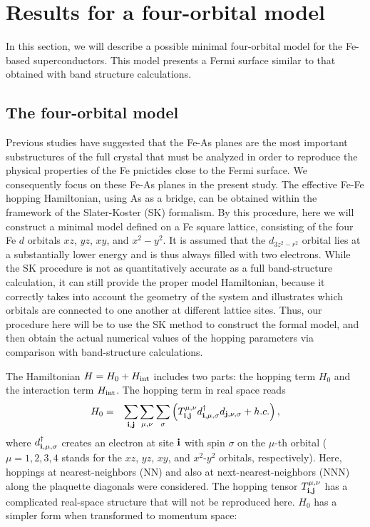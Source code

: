 \documentclass[aps,prb,superscriptaddress,preprintnumbers,
showpacs,legalpaper,twoside,twocolumn,amsmath,amssymb]{revtex4}
\begin{document}
\section{Results for a four-orbital model}

In this section, we will describe a possible minimal four-orbital model for
the Fe-based superconductors. This model presents a Fermi surface similar to that
obtained with band structure calculations.

\subsection{The four-orbital model}

Previous studies have suggested that the Fe-As planes are the most
important substructures of the full crystal that must be analyzed in order
to reproduce the physical properties of the Fe pnictides
close to the Fermi surface. We consequently focus on these
Fe-As planes in the present study.
The effective Fe-Fe hopping Hamiltonian, using As as a bridge,
can be obtained within the
framework of the Slater-Koster (SK) formalism.\cite{slater} By this
procedure, here we will construct a minimal model defined on a Fe square lattice,
consisting of the four Fe $d$ orbitals $xz$, $yz$, $xy$, and
$x^2-y^2$. It is assumed that the $d_{3z^2-r^2}$ orbital lies at a
substantially lower energy and is thus
always filled with two electrons.\cite{singh,first, xu, cao, fang2} While the SK procedure
is not as quantitatively accurate as a full band-structure calculation, it can
still provide the proper model Hamiltonian, because it correctly takes
into account the geometry of the system and illustrates which orbitals are
connected to one another at different lattice sites. Thus, our procedure here will be to use the SK method
to construct the formal model, and then obtain the actual numerical values of the
hopping parameters via comparison with band-structure calculations.

The Hamiltonian $H=H_0 + H_{\rm int}$ includes two parts: the hopping term $H_0$ and the
interaction term $H_{\rm int}$. The hopping term in real space reads
%
\begin{eqnarray}\label{E.H0r}
H_0 &=& \sum_{\bf i,j}\sum_{\mu,\nu}\sum_\sigma \left( T^{\mu,\nu}_{\bf i,j}
d^\dagger_{{\bf i},\mu,\sigma} d_{{\bf j},\nu,\sigma} + h.c. \right),
\end{eqnarray}
%
where $d^\dagger_{{\bf i},\mu,\sigma}$ creates an electron
at site ${\bf i}$
with spin $\sigma$ on the $\mu$-th orbital ($\mu=1,2,3,4$ stands for the
$xz$, $yz$, $xy$, and $x^2$-$y^2$ orbitals, respectively). Here, hoppings
at nearest-neighbors (NN) and also at next-nearest-neighbors (NNN) along the plaquette
diagonals were considered. The hopping
tensor $T^{\mu,\nu}_{\bf i,j}$ has a complicated real-space structure
that will not be reproduced here. $H_0$ has a
simpler form when transformed to momentum space:
\end{document}
